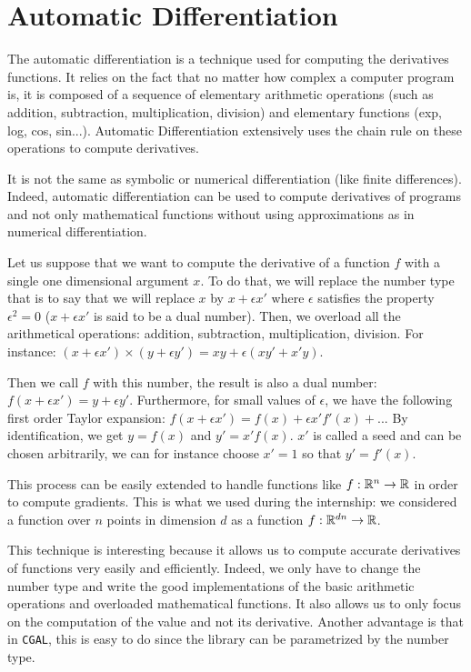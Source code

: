 \chapter{Automatic Differentiation}
\label{appendix:ad}

The automatic differentiation is a technique used for computing the derivatives
functions. It relies on the fact that no matter how complex a computer program
is, it is composed of a sequence of elementary arithmetic operations (such as
addition, subtraction, multiplication, division) and elementary functions (exp,
log, cos, sin...). Automatic Differentiation extensively uses the chain rule on
these operations to compute derivatives.

It is not the same as symbolic or numerical differentiation (like finite
differences). Indeed, automatic differentiation can be used to compute
derivatives of programs and not only mathematical functions without using
approximations as in numerical differentiation.

Let us suppose that we want to compute the derivative of a function $ f $ with a
single one dimensional argument $ x $. To do that, we will replace the number
type that is to say that we will replace $ x $ by $ x + \epsilon x' $ where $
\epsilon $ satisfies the property $ \epsilon^2 = 0 $ ($ x + \epsilon x' $ is
said to be a dual number). Then, we overload all the arithmetical operations:
addition, subtraction, multiplication, division. For instance: $ (x + \epsilon
x') \times (y + \epsilon y') = x y + \epsilon (x y' + x' y) $.

Then we call $ f $ with this number, the result is also a dual number: $ f(x +
\epsilon x') = y + \epsilon y' $.  Furthermore, for small values of $ \epsilon
$, we have the following first order Taylor expansion: $ f(x + \epsilon x') =
f(x) + \epsilon x' f'(x) + ... $ By identification, we get $ y = f(x) $ and $
y' = x' f(x) $. $ x' $ is called a seed and can be chosen arbitrarily, we can
for instance choose $ x ' = 1 $ so that $ y' = f'(x) $.

This process can be easily extended to handle functions like $ f : \mathbb{R}^n
\rightarrow \mathbb{R} $ in order to compute gradients. This is what we used during the
internship: we considered a function over $ n $ points in dimension $ d $ as a
function $ f : \mathbb{R}^{dn} \rightarrow \mathbb{R} $.

This technique is interesting because it allows us to compute accurate
derivatives of functions very easily and efficiently. Indeed, we only have to
change the number type and write the good implementations of the basic
arithmetic operations and overloaded mathematical functions. It also allows us
to only focus on the computation of the value and not its derivative. Another
advantage is that in \texttt{CGAL}, this is easy to do since the library can be
parametrized by the number type.

